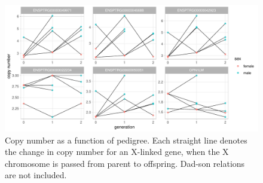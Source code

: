 \begin{figure}[h] 
  \centering
  \includegraphics[scale=0.78]{figures/fig_pedigree_CN_3.pdf}
  \caption{Copy number as a function of pedigree. Each straight line denotes the change in copy number for an X-linked gene, when the X chromosome is passed from parent to offspring. Dad-son relations are not included.}
  \label{fig:pedigree_CN}
\end{figure}



